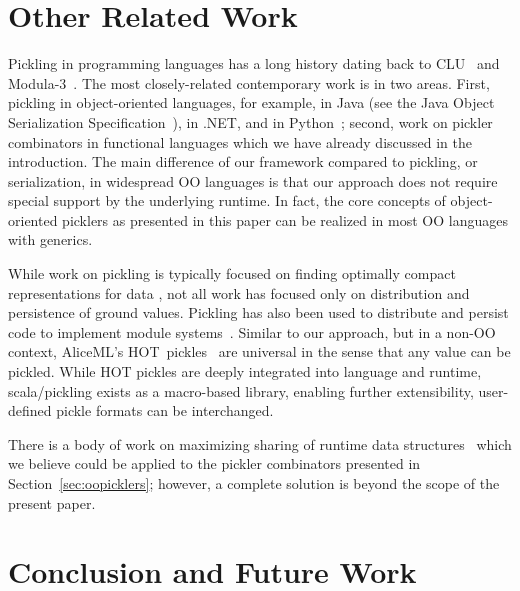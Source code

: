 \section{Other Related Work}
\label{sec:related-work}

Pickling in programming languages has a long history dating back to
CLU~\cite{HerlihyL82} and Modula-3~\cite{CardelliDJKN89}. The most
closely-related contemporary work is in two areas. First, pickling in
object-oriented languages, for example, in Java (see the Java Object
Serialization Specification~\cite{JavaSerialization}), in .NET, and in
Python~\cite{Rossum07}; second, work on pickler combinators in
functional languages which we have already discussed in the
introduction. The main difference of our framework compared to
pickling, or serialization, in widespread OO languages is that our
approach does not require special support by the underlying
runtime. In fact, the core concepts of object-oriented picklers as
presented in this paper can be realized in most OO languages with
generics.

While work on pickling is typically focused on finding optimally compact
representations for data \cite{EveryBitCounts}, not all work has focused only
on distribution and persistence of ground values. Pickling has also been
used to distribute and persist code to implement module systems~\cite{Roy99,Rossberg2007}.
Similar to our approach, but in a non-OO context, AliceML's HOT~pickles~\cite{HOTPickles}
are universal in the sense that any value
can be pickled. While HOT pickles are deeply integrated into language and
runtime, scala/pickling exists as a macro-based library, enabling further
extensibility, \eg user-defined pickle formats can be interchanged.

There is a body of work on maximizing sharing of runtime data
structures~\cite{appel93hashconsing,Elsman2005,TackKS06} which we believe
could be applied to the pickler combinators presented in
Section~\ref{sec:oopicklers}; however, a complete solution is beyond the scope
of the present paper.



\section{Conclusion and Future Work}

